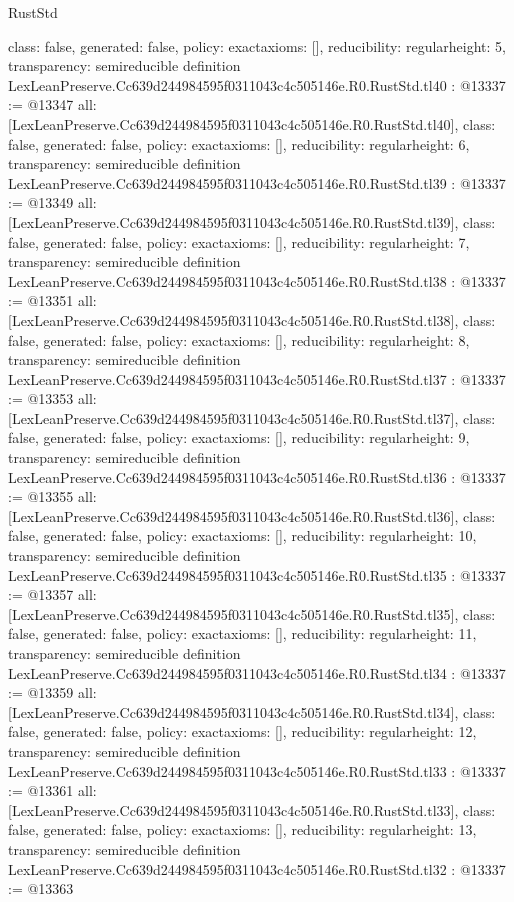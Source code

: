 \begin{lexlean}{RustStd}
\begin{coremodule}
{  class: false,
  generated: false,
  policy: exact{axioms: []},
  reducibility: regular{height: 5},
  transparency: semireducible
}
definition LexLeanPreserve.Cc639d244984595f0311043c4c505146e.R0.RustStd.tl40 : @13337 := @13347 {
  all: [LexLeanPreserve.Cc639d244984595f0311043c4c505146e.R0.RustStd.tl40],
  class: false,
  generated: false,
  policy: exact{axioms: []},
  reducibility: regular{height: 6},
  transparency: semireducible
}
definition LexLeanPreserve.Cc639d244984595f0311043c4c505146e.R0.RustStd.tl39 : @13337 := @13349 {
  all: [LexLeanPreserve.Cc639d244984595f0311043c4c505146e.R0.RustStd.tl39],
  class: false,
  generated: false,
  policy: exact{axioms: []},
  reducibility: regular{height: 7},
  transparency: semireducible
}
definition LexLeanPreserve.Cc639d244984595f0311043c4c505146e.R0.RustStd.tl38 : @13337 := @13351 {
  all: [LexLeanPreserve.Cc639d244984595f0311043c4c505146e.R0.RustStd.tl38],
  class: false,
  generated: false,
  policy: exact{axioms: []},
  reducibility: regular{height: 8},
  transparency: semireducible
}
definition LexLeanPreserve.Cc639d244984595f0311043c4c505146e.R0.RustStd.tl37 : @13337 := @13353 {
  all: [LexLeanPreserve.Cc639d244984595f0311043c4c505146e.R0.RustStd.tl37],
  class: false,
  generated: false,
  policy: exact{axioms: []},
  reducibility: regular{height: 9},
  transparency: semireducible
}
definition LexLeanPreserve.Cc639d244984595f0311043c4c505146e.R0.RustStd.tl36 : @13337 := @13355 {
  all: [LexLeanPreserve.Cc639d244984595f0311043c4c505146e.R0.RustStd.tl36],
  class: false,
  generated: false,
  policy: exact{axioms: []},
  reducibility: regular{height: 10},
  transparency: semireducible
}
definition LexLeanPreserve.Cc639d244984595f0311043c4c505146e.R0.RustStd.tl35 : @13337 := @13357 {
  all: [LexLeanPreserve.Cc639d244984595f0311043c4c505146e.R0.RustStd.tl35],
  class: false,
  generated: false,
  policy: exact{axioms: []},
  reducibility: regular{height: 11},
  transparency: semireducible
}
definition LexLeanPreserve.Cc639d244984595f0311043c4c505146e.R0.RustStd.tl34 : @13337 := @13359 {
  all: [LexLeanPreserve.Cc639d244984595f0311043c4c505146e.R0.RustStd.tl34],
  class: false,
  generated: false,
  policy: exact{axioms: []},
  reducibility: regular{height: 12},
  transparency: semireducible
}
definition LexLeanPreserve.Cc639d244984595f0311043c4c505146e.R0.RustStd.tl33 : @13337 := @13361 {
  all: [LexLeanPreserve.Cc639d244984595f0311043c4c505146e.R0.RustStd.tl33],
  class: false,
  generated: false,
  policy: exact{axioms: []},
  reducibility: regular{height: 13},
  transparency: semireducible
}
definition LexLeanPreserve.Cc639d244984595f0311043c4c505146e.R0.RustStd.tl32 : @13337 := @13363 {
}
\end{coremodule}
\end{lexlean}
